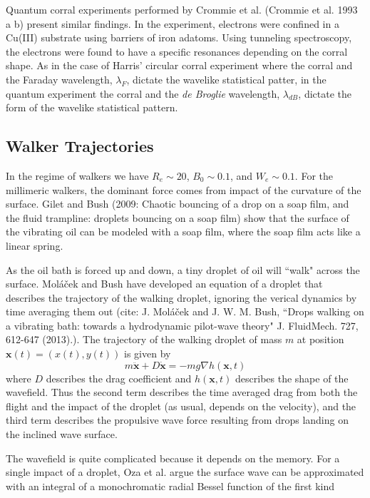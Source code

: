 Quantum corral experiments performed by Crommie et al. (Crommie et al. 1993 a b) present similar findings. In the experiment, electrons were confined in a Cu(III) substrate using barriers of iron adatoms. Using tunneling spectroscopy, the electrons were found to have a specific resonances depending on the corral shape. As in the case of Harris' circular corral experiment where the corral and the Faraday wavelength, $\lambda_F$, dictate the wavelike statistical patter, in the quantum experiment the corral and the \textit{de Broglie} wavelength, $\lambda_{dB}$, dictate the form of the wavelike statistical pattern. 

\subsection{Walker Trajectories}
In the regime of walkers we have $R_e \sim 20$, $B_0 \sim 0.1$, and $W_e \sim 0.1$. For the millimeric walkers, the dominant force comes from impact of the curvature of the surface. Gilet and Bush (2009: Chaotic bouncing of a drop on a soap film, and the fluid trampline: droplets bouncing on a soap film) show that the surface of the vibrating oil can be modeled with a soap film, where the soap film acts like a linear spring. 

As the oil bath is forced up and down, a tiny droplet of oil will ``walk" across the surface. Mol\'{a}\v{c}ek and Bush have developed an equation of a droplet that describes the trajectory of the walking droplet, ignoring the verical dynamics by time averaging them out (cite: J. Mol\'{a}\v{c}ek and J. W. M. Bush, ``Drops walking on a vibrating bath: towards a hydrodynamic pilot-wave theory" J. FluidMech. 727, 612-647 (2013).). The trajectory of the walking droplet of mass $m$ at position $\textbf{x}(t) = (x(t),y(t))$ is given by
\begin{equation}
m \ddot{\textbf{x}} + D \dot{\textbf{x}} = -mg\nabla h(\textbf{x},t) 
\end{equation}
where $D$ describes the drag coefficient and $h(\textbf{x},t)$ describes the shape of the wavefield. Thus the second term describes the time averaged drag from both the flight and the impact of the droplet (as usual, depends on the velocity), and the third term describes the propulsive wave force resulting from drops landing on the inclined wave surface. 

The wavefield is quite complicated because it depends on the memory. For a single impact of a droplet, Oza et al. argue the surface wave can be approximated with an integral of a monochromatic radial Bessel function of the first kind

